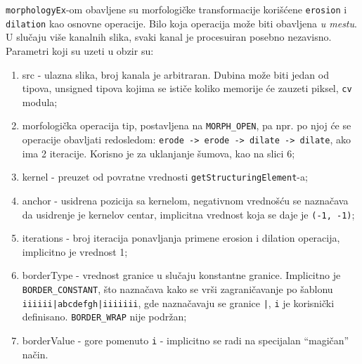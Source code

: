 \documentclass[fontsize=12bp, paper=a4]{scrarticle}
\begin{document}

\verb|morphologyEx|-om obavljene su morfologičke transformacije korišćene \texttt{erosion} i \verb|dilation| kao osnovne operacije.\cite{mex} Bilo koja operacija može biti obavljena \textit{u mestu}. U slučaju više kanalnih slika, svaki kanal je procesuiran posebno nezavisno. Parametri koji su uzeti u obzir su:
\begin{enumerate}
    \item src - ulazna slika, broj kanala je arbitraran. Dubina može biti jedan od tipova, unsigned tipova kojima se ističe koliko memorije će zauzeti piksel, \verb|cv| modula;
    \item morfologička operacija tip, postavljena na \verb|MORPH_OPEN|, pa npr. po njoj će se operacije obavljati redosledom: \verb|erode -> erode -> dilate -> dilate|, ako ima 2 iteracije. Korisno je za uklanjanje šumova, kao na slici 6;
    \item kernel - preuzet od povratne vrednosti  \verb|getStructuringElement|-a;
    \item  anchor - usidrena pozicija sa kernelom, negativnom vrednošću se naznačava da usidrenje je kernelov centar, implicitna vrednost koja se daje je \verb|(-1, -1)|;
    \item iterations - broj iteracija ponavljanja primene erosion i dilation operacija, implicitno je vrednost 1;
    \item borderType - vrednost granice u slučaju konstantne granice. Implicitno je \verb|BORDER_CONSTANT|, što naznačava kako se vrši zagraničavanje po šablonu \texttt{iiiiii|abcdefgh|iiiiiii}, gde naznačavaju se granice \texttt{|}, \texttt{i} je korisnički definisano. \verb|BORDER_WRAP| nije podržan;
    \item borderValue - gore pomenuto \texttt{i} - implicitno se radi na specijalan ``magičan'' način.
\end{enumerate}
\end{document}
